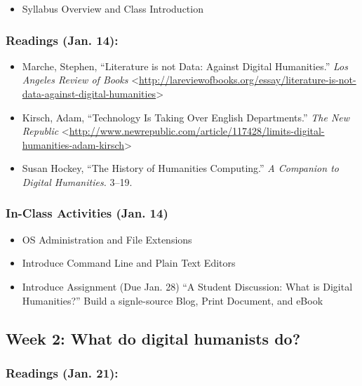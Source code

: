\documentclass[]{article}
\begin{document}
\begin{itemize}
\itemsep1pt\parskip0pt
\item
  Syllabus Overview and Class Introduction
\end{itemize}

\subsubsection{Readings (Jan. 14):}\label{readings-jan.-14}

\begin{itemize}
\itemsep1pt\parskip0pt
\item
  Marche, Stephen, ``Literature is not Data: Against Digital
  Humanities.'' \emph{Los Angeles Review of Books}
  \textless{}\url{http://lareviewofbooks.org/essay/literature-is-not-data-against-digital-humanities}\textgreater{}
\item
  Kirsch, Adam, ``Technology Is Taking Over English Departments.''
  \emph{The New Republic}
  \textless{}\url{http://www.newrepublic.com/article/117428/limits-digital-humanities-adam-kirsch}\textgreater{}
\item
  Susan Hockey, ``The History of Humanities Computing.'' \emph{A
  Companion to Digital Humanities.} 3--19.
\end{itemize}

\subsubsection{In-Class Activities (Jan.
14)}\label{in-class-activities-jan.-14}

\begin{itemize}
\itemsep1pt\parskip0pt
\item
  OS Administration and File Extensions
\item
  Introduce Command Line and Plain Text Editors
\item
  Introduce Assignment (Due Jan. 28) ``A Student Discussion: What is
  Digital Humanities?'' Build a signle-source Blog, Print Document, and
  eBook
\end{itemize}

\subsection{Week 2: What do digital humanists
do?}\label{week-2-what-do-digital-humanists-do}

\subsubsection{Readings (Jan. 21):}\label{readings-jan.-21}
\end{document}
